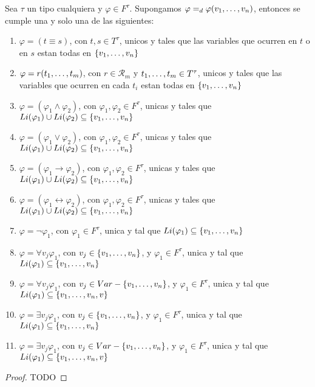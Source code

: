 \begin{lemma}
  Sea $\tau$ un tipo cualquiera y $\varphi \in F^\tau$. Supongamos $\varphi =_d \varphi(v_{1}, \dots, v_{n})$, entonces 
  se cumple una y solo una de las siguientes: \begin{enumerate}
    \item $\varphi = (t\equiv s)$, con $t, s \in T^\tau$, unicos y tales que las variables que ocurren en $t$ o en $s$ estan todas en $\{v_{1}, \dots, v_{n}\}$
    \item $\varphi = r(t_{1}, \dots, t_{m})$, con $r \in \mathcal{R}_m$ y $t_{1}, \dots, t_{m} \in T^\tau$, unicos y tales que las variables que ocurren en cada $t_i$ estan todas en $\{v_{1}, \dots, v_{n}\}$
    \item $\varphi = (\varphi_1 \land \varphi_2)$, con $\varphi_1, \varphi_2 \in F^\tau$, unicas y tales que $Li(\varphi_1)\cup Li(\varphi_2) \subseteq \{v_{1}, \dots, v_{n}\}$
    \item $\varphi = (\varphi_1 \lor \varphi_2)$, con $\varphi_1, \varphi_2 \in F^\tau$, unicas y tales que $Li(\varphi_1)\cup Li(\varphi_2) \subseteq \{v_{1}, \dots, v_{n}\}$
    \item $\varphi = (\varphi_1 \rightarrow \varphi_2)$, con $\varphi_1, \varphi_2 \in F^\tau$, unicas y tales que $Li(\varphi_1)\cup Li(\varphi_2) \subseteq \{v_{1}, \dots, v_{n}\}$
    \item $\varphi = (\varphi_1 \leftrightarrow \varphi_2)$, con $\varphi_1, \varphi_2 \in F^\tau$, unicas y tales que $Li(\varphi_1)\cup Li(\varphi_2) \subseteq \{v_{1}, \dots, v_{n}\}$
    \item $\varphi = \neg\varphi_1$, con $\varphi_1 \in F^\tau$, unica y tal que $Li(\varphi_1) \subseteq \{v_{1}, \dots, v_{n}\}$
    \item $\varphi = \forall v_j\varphi_1$, con $v_j \in \{v_{1}, \dots, v_{n}\}$, y $\varphi_1 \in F^\tau$, unica y tal que $Li(\varphi_1) \subseteq \{v_{1}, \dots, v_{n}\}$
    \item $\varphi = \forall v_j\varphi_1$, con $v_j \in Var - \{v_{1}, \dots, v_{n}\}$, y $\varphi_1 \in F^\tau$, unica y tal que $Li(\varphi_1) \subseteq \{v_{1}, \dots, v_{n}, v\}$
    \item $\varphi = \exists v_j\varphi_1$, con $v_j \in \{v_{1}, \dots, v_{n}\}$, y $\varphi_1 \in F^\tau$, unica y tal que $Li(\varphi_1) \subseteq \{v_{1}, \dots, v_{n}\}$
    \item $\varphi = \exists v_j\varphi_1$, con $v_j \in Var - \{v_{1}, \dots, v_{n}\}$, y $\varphi_1 \in F^\tau$, unica y tal que $Li(\varphi_1) \subseteq \{v_{1}, \dots, v_{n}, v\}$
  \end{enumerate}
\end{lemma}
\begin{proof}
  TODO
\end{proof}

